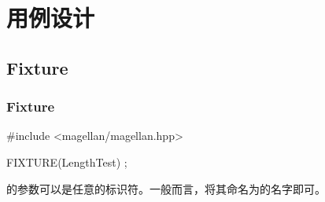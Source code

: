 \begin{savequote}[45mm]
\end{savequote}

\chapter{用例设计} 
\label{ch:test-case}

\section{Fixture}

\begin{content}

\subsection{Fixture}

\begin{leftbar}
\begin{c++}[caption={test/quantity/LengthTest.cpp}]
#include <magellan/magellan.hpp>

FIXTURE(LengthTest)
{
};
\end{c++}
\end{leftbar}

的参数可以是任意的标识符。一般而言，将其命名为的名字即可。








\end{content}

